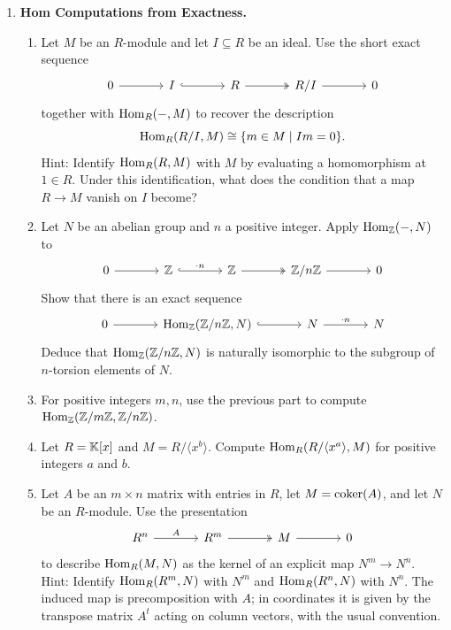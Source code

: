 \documentclass[Notebook.tex]{subfiles}
\begin{document}
\begin{enumerate}[leftmargin=*, resume=problems]
\item \textbf{Hom Computations from Exactness.}
\begin{enumerate}
\item Let $M$ be an $R$-module and let $I\subseteq R$ be an ideal. Use the short exact sequence
\[
\begin{tikzcd}[column sep=large]
0 \arrow[r] & I \arrow[r, hook] & R \arrow[r, two heads] & R/I \arrow[r] & 0
\end{tikzcd}
\]
together with $\operatorname{Hom}_R(-,M)$ to recover the description
\[
\operatorname{Hom}_R(R/I,M)\cong \{m\in M\mid Im=0\}.
\]
Hint: Identify $\operatorname{Hom}_R(R,M)$ with $M$ by evaluating a homomorphism at $1\in R$. Under this identification, what does the condition that a map $R\to M$ vanish on $I$ become?
\item Let $N$ be an abelian group and $n$ a positive integer. Apply $\operatorname{Hom}_{\mathbb Z}(-,N)$ to
\[
\begin{tikzcd}[column sep=large]
0 \arrow[r] & \Z \arrow[r, hook, "\cdot n"] & \Z \arrow[r, two heads] & \Z/n\Z \arrow[r] & 0
\end{tikzcd}
\]
Show that there is an exact sequence
\[
\begin{tikzcd}[column sep=large]
0 \arrow[r] & \Hom_{\Z}(\Z/n\Z,N) \arrow[r, hook] & N \arrow[r, "\cdot n"] & N
\end{tikzcd}
\]
Deduce that $\operatorname{Hom}_{\mathbb Z}(\mathbb Z/n\mathbb Z,N)$ is naturally isomorphic to the subgroup of $n$-torsion elements of $N$.
\item For positive integers $m,n$, use the previous part to compute $\operatorname{Hom}_{\mathbb Z}(\mathbb Z/m\mathbb Z,\mathbb Z/n\mathbb Z)$.
\item Let $R=\mathbb K[x]$ and $M=R/\langle x^b\rangle$. Compute $\operatorname{Hom}_R(R/\langle x^a\rangle,M)$ for positive integers $a$ and $b$.
\item Let $A$ be an $m\times n$ matrix with entries in $R$, let $M=\operatorname{coker}(A)$, and let $N$ be an $R$-module. Use the presentation
\[
\begin{tikzcd}[column sep=large]
R^n \arrow[r, "A"] & R^m \arrow[r, two heads] & M \arrow[r] & 0
\end{tikzcd}
\]
to describe $\operatorname{Hom}_R(M,N)$ as the kernel of an explicit map $N^m\to N^n$. Hint: Identify $\operatorname{Hom}_R(R^m,N)$ with $N^m$ and $\operatorname{Hom}_R(R^n,N)$ with $N^n$. The induced map is precomposition with $A$; in coordinates it is given by the transpose matrix $A^t$ acting on column vectors, with the usual convention.
\end{enumerate}


\end{enumerate}
\end{document}
